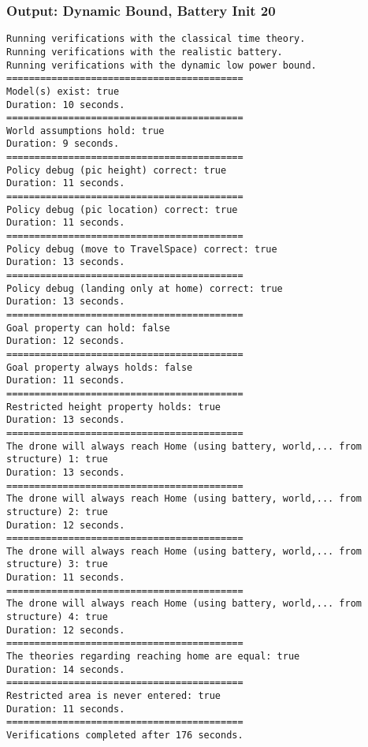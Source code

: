\documentclass[12pt]{extarticle}
\begin{document}
\subsubsection*{Output: Dynamic Bound, Battery Init 20}
\begin{lstlisting}[basicstyle=\tiny]
Running verifications with the classical time theory.
Running verifications with the realistic battery.
Running verifications with the dynamic low power bound.
==========================================
Model(s) exist: true
Duration: 10 seconds.
==========================================
World assumptions hold: true
Duration: 9 seconds.
==========================================
Policy debug (pic height) correct: true
Duration: 11 seconds.
==========================================
Policy debug (pic location) correct: true
Duration: 11 seconds.
==========================================
Policy debug (move to TravelSpace) correct: true
Duration: 13 seconds.
==========================================
Policy debug (landing only at home) correct: true
Duration: 13 seconds.
==========================================
Goal property can hold: false
Duration: 12 seconds.
==========================================
Goal property always holds: false
Duration: 11 seconds.
==========================================
Restricted height property holds: true
Duration: 13 seconds.
==========================================
The drone will always reach Home (using battery, world,... from structure) 1: true
Duration: 13 seconds.
==========================================
The drone will always reach Home (using battery, world,... from structure) 2: true
Duration: 12 seconds.
==========================================
The drone will always reach Home (using battery, world,... from structure) 3: true
Duration: 11 seconds.
==========================================
The drone will always reach Home (using battery, world,... from structure) 4: true
Duration: 12 seconds.
==========================================
The theories regarding reaching home are equal: true
Duration: 14 seconds.
==========================================
Restricted area is never entered: true
Duration: 11 seconds.
==========================================
Verifications completed after 176 seconds.
\end{lstlisting}
\vspace{3mm}
\end{document}
